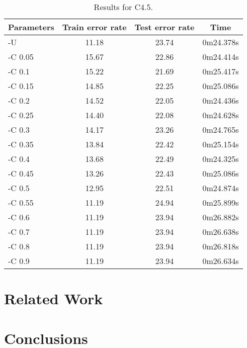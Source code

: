 \documentclass[a4paper]{llncs}
\begin{document}
\begin{table}[ht]
  \begin{center}
  \begin{tabular}{ | l | c | c | c |}
    \hline
    \textbf{Parameters} & \textbf{Train error rate} & \textbf{Test error rate} & \textbf{Time} \\ \hline
    -U & 11.18 & 23.74 & 0m24.378s \\ \hline
    -C 0.05 & 15.67 & 22.86 & 0m24.414s \\ \hline
    -C 0.1 & 15.22 & 21.69 & 0m25.417s \\ \hline
    -C 0.15 & 14.85 & 22.25 & 0m25.086s \\ \hline
    -C 0.2 & 14.52 & 22.05 & 0m24.436s \\ \hline
    -C 0.25 & 14.40 & 22.08 & 0m24.628s \\ \hline
    -C 0.3 & 14.17 & 23.26 & 0m24.765s \\ \hline
    -C 0.35 & 13.84 & 22.42 & 0m25.154s \\ \hline
    -C 0.4 & 13.68 & 22.49 & 0m24.325s \\ \hline
    -C 0.45 & 13.26 & 22.43 & 0m25.086s \\ \hline
    -C 0.5 & 12.95 & 22.51 & 0m24.874s \\ \hline
    -C 0.55 & 11.19 & 24.94 & 0m25.899s \\ \hline
    -C 0.6 & 11.19 & 23.94 & 0m26.882s \\ \hline
    -C 0.7 & 11.19 & 23.94 & 0m26.638s \\ \hline
    -C 0.8 & 11.19 & 23.94 & 0m26.818s \\ \hline
    -C 0.9 & 11.19 & 23.94 & 0m26.634s \\ \hline
  \end{tabular}
  \caption{Results for C4.5.}
  \label{tbl:results_c45}
  \end{center}
\end{table}

\section{Related Work}

\section{Conclusions}
\end{document}
